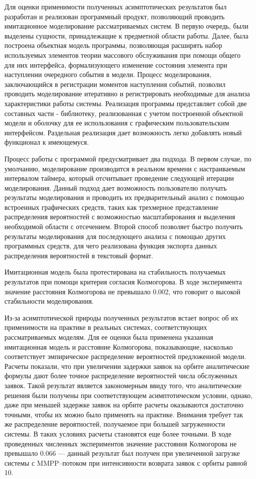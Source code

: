 Для оценки применимости полученных асимптотических результатов был разработан и реализован программный продукт, позволяющий проводить имитационное моделирование рассматриваемых систем. В первую очередь, были выделены сущности, принадлежащие к предметной области работы. Далее, была построена объектная модель программы, позволяющая расширять набор используемых элементов теории массового обслуживания при помощи общего для них интерфейса, формализующего изменение состояния элемента при наступлении очередного события в модели. Процесс моделирования, заключающийся в регистрации моментов наступления событий, позволил проводить моделирование итеративно и регистрировать необходимые для анализа характеристики работы системы. Реализация программы представляет собой две составных части - библиотеку, реализованная с учетом построенной объектной модели и оболочку для ее использования с графическим пользовательским интерфейсом. Раздельная реализация дает возможность легко добавлять новый функционал к имеющемуся.  

Процесс работы с программой предусматривает два подхода. В первом случае, по умолчанию, моделирование производится в реальном времени с настраиваемым интервалом таймера, который отсчитывает проведение следующей итерации моделирования. Данный подход дает возможность пользователю получать результаты моделирования и проводить их предварительный анализ с помощью встроенных графических средств, таких как трехмерное представление распределения вероятностей с возможностью масштабирования и выделения необходимой области с отсечением. Второй способ позволяет быстро получить результаты моделирования для последующего анализа с помощью других программных средств, для чего реализована функция экспорта данных распределения вероятностей в текстовый формат. 

Имитационная модель была протестирована на стабильность получаемых результатов при помощи критерия согласия Колмогорова. В ходе эксперимента значение расстояния Колмогорова не превышало 0.002, что говорит о высокой стабильности моделирования.

Из-за асимптотической природы полученных результатов встает вопрос об их применимости на практике в реальных системах, соответствующих рассматриваемых моделям. Для ее оценки была применена указанная имитационная модель и расстояние Колмогорова, показывающие, насколько соответствует эмпирическое распределение вероятностей предложенной модели. Расчеты показали, что при увеличении задержки заявок на орбите аналитические формулы дают более точное распределение вероятностей числа обслуженных заявок. Такой результат является закономерным ввиду того, что аналитические решения были получены при соответствующем асимптотическом условии, однако, даже при меньшей задержке заявок на орбите расчеты оказываются достаточно точными, чтобы их можно было применять на практике. Внимания требует так же распределение вероятностей, получаемое при большей загруженности системы. В таких условиях расчеты становятся еще более точными. В ходе проведенных численных экспериментов значение расстояния Колмогорова не превышало 0.066 --- данный результат был получен при увеличенной загрузке системы с MMPP--потоком при интенсивности возврата заявок с орбиты равной 10.

